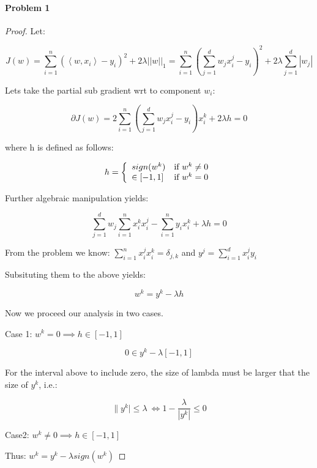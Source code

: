\documentclass[12pt]{report}
\begin{document}
\maketitle

\paragraph{Problem 1}

\begin{proof}Let:

$$J(w) = \sum_{i=1}^n ( \left\langle w, x_i \right\rangle - y_i ) ^2 + 2\lambda  ||w||_1 = \sum_{i=1}^n ( \sum_{j=1}^d w_j x_i^j - y_i ) ^2 + 2\lambda \sum_{j=1}^d |w_j| $$

Lets take the partial sub gradient wrt to component $w_i$:

$$\partial J(w) = 2 \sum_{i=1}^n ( \sum_{j=1}^d w_j x_i^j - y_i ) x_i^k + 2\lambda h  = 0$$

where h is defined as follows:

\begin{displaymath}
   h = \left\{
     \begin{array}{lr}
       sign(w^k) & $if $ w^k \neq 0\\
       \in \left[-1, 1 \right] & $if $ w^k = 0
     \end{array}
   \right.
\end{displaymath} 

Further algebraic manipulation yields:

$$ \sum_{j=1}^d w_j\sum_{i=1}^n x_i^k x_i^j - \sum_{i=1}^n y_i  x_i^k + \lambda h  = 0$$

From the problem we know: $\sum_{i=1}^n x_i^j x_i^k  = \delta_{j,k}$ and $y^j = \sum_{i=1}^d x_i^j y_i$ 

Subsituting them to the above yields:

$$ w^k =  y^k - \lambda h $$

Now we proceed our analysis in two cases. 

Case 1: $w^k = 0 \implies h \in [-1,1]$

$$0 \in  y^k - \lambda \left[-1, 1 \right] $$

For the interval above to include zero, the size of lambda must be larger that the size of $y^k$, i.e.:

$$\|y^k| \leq \lambda\  \iff  1- \frac{\lambda}{|y^k|} \leq 0 $$

Case2: $w^k \neq 0 \implies h \in [-1,1] $

Thus: $w^k =  y^k - \lambda sign(w^k)$


\end{proof}
\end{document}
